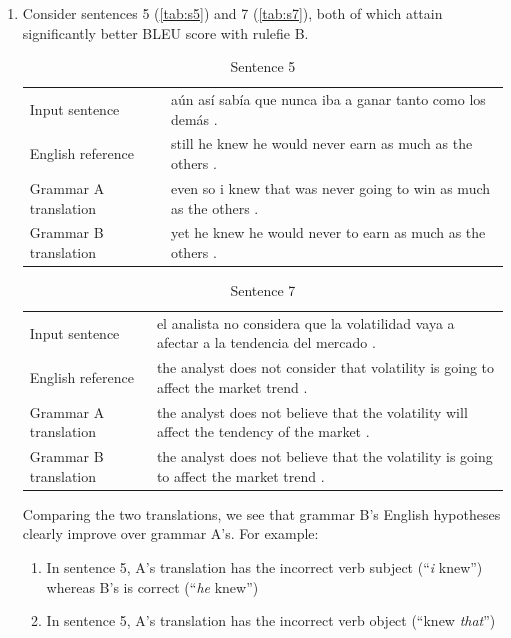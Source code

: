 \documentclass[a4paper,oneside,reqno]{amsart}
\begin{document}
\begin{enumerate}[label=\arabic*.]
    \begin{enumerate}[label=(\alph*)]
      \item
        Consider sentences 5 (\autoref{tab:s5}) and 7 (\autoref{tab:s7}), both of which
        attain significantly better BLEU score with rulefie B.
        \begin{table}[H]
          \begin{tabular}{p{5cm}p{10cm}}
            Input sentence & aún así sabía que nunca iba a ganar tanto como los demás . \\
            English reference & still he knew he would never earn as much as the others . \\
            Grammar A translation & even so i knew that was never going to win as much as the others . \\
            Grammar B translation & yet he knew he would never to earn as much as the others . \\
          \end{tabular}
          \caption{Sentence 5}
          \label{tab:s5}
        \end{table}
        \begin{table}[H]
          \begin{tabular}{p{5cm}p{10cm}}
            Input sentence & el analista no considera que la volatilidad vaya a afectar a la tendencia del mercado .  \\
            English reference & the analyst does not consider that volatility is going to affect the market trend .  \\
            Grammar A translation & the analyst does not believe that the volatility will affect the tendency of the market .  \\
            Grammar B translation & the analyst does not believe that the volatility is going to affect the market trend .  \\
          \end{tabular}
          \caption{Sentence 7}
          \label{tab:s7}
        \end{table}
        Comparing the two translations, we see that grammar B's English
        hypotheses clearly improve over grammar A's. For example:
        \begin{enumerate}
          \item In sentence 5, A's translation has the incorrect verb subject
            (``\emph{i} knew'') whereas B's is correct (``\emph{he} knew'')
          \item In sentence 5, A's translation has the incorrect verb object (``knew \emph{that}'')

\end{enumerate}
\end{enumerate}
\end{enumerate}
\end{document}
